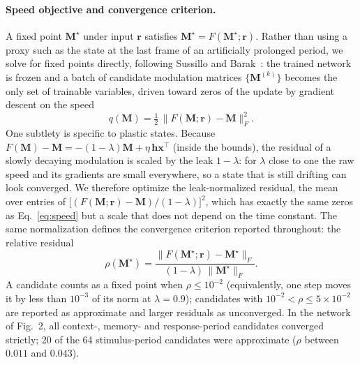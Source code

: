 \documentclass{article}
\begin{document}
\paragraph{Speed objective and convergence criterion.}
A fixed point $\mathbf{M}^\star$ under input $\mathbf{r}$ satisfies $\mathbf{M}^\star = F(\mathbf{M}^\star;\mathbf{r})$. Rather than using a proxy such as the state at the last frame of an artificially prolonged period, we solve for fixed points directly, following Sussillo and Barak~\cite{sussillo2013opening}: the trained network is frozen and a batch of candidate modulation matrices $\{\mathbf{M}^{(k)}\}$ becomes the only set of trainable variables, driven toward zeros of the update by gradient descent on the speed
\begin{equation}
  q(\mathbf{M}) = \tfrac{1}{2}\,\big\lVert F(\mathbf{M};\mathbf{r}) - \mathbf{M}\big\rVert_F^{2}.
  \label{eq:speed}
\end{equation}
One subtlety is specific to plastic states. Because $F(\mathbf{M}) - \mathbf{M} = -(1-\lambda)\mathbf{M} + \eta\,\mathbf{h}\mathbf{x}^{\top}$ (inside the bounds), the residual of a slowly decaying modulation is scaled by the leak $1-\lambda$: for $\lambda$ close to one the raw speed and its gradients are small everywhere, so a state that is still drifting can look converged. We therefore optimize the leak-normalized residual, the mean over entries of $\big[(F(\mathbf{M};\mathbf{r}) - \mathbf{M})/(1-\lambda)\big]^2$, which has exactly the same zeros as Eq.~\eqref{eq:speed} but a scale that does not depend on the time constant. The same normalization defines the convergence criterion reported throughout: the relative residual
\begin{equation}
  \rho(\mathbf{M}^\star) =
  \frac{\lVert F(\mathbf{M}^\star;\mathbf{r}) - \mathbf{M}^\star\rVert_F}
       {(1-\lambda)\,\lVert \mathbf{M}^\star\rVert_F} .
\end{equation}
A candidate counts as a fixed point when $\rho \le 10^{-2}$ (equivalently, one step moves it by less than $10^{-3}$ of its norm at $\lambda = 0.9$); candidates with $10^{-2} < \rho \le 5\times10^{-2}$ are reported as approximate and larger residuals as unconverged. In the network of Fig.~2, all context-, memory- and response-period candidates converged strictly; 20 of the 64 stimulus-period candidates were approximate ($\rho$ between $0.011$ and $0.043$).
\end{document}
